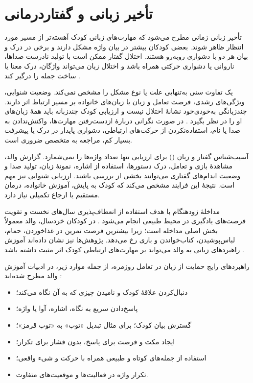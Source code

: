 \section{تأخیر زبانی و گفتاردرمانی}

تأخیر زبانی زمانی مطرح می‌شود که مهارت‌های زبانی کودک آهسته‌تر از مسیر مورد انتظار ظاهر شوند. بعضی کودکان بیشتر در بیان واژه مشکل دارند و برخی در درک و بیان هر دو با دشواری روبه‌رو هستند. اختلال گفتار ممکن است با تولید نادرست صداها، ناروانی یا دشواری حرکتی همراه باشد و اختلال زبان می‌تواند واژگان، درک معنا یا ساخت جمله را درگیر کند \cite{NIDCDMilestones2022,ASHALateLanguage}.

یک تفاوت سنی به‌تنهایی علت یا نوع مشکل را مشخص نمی‌کند. وضعیت شنوایی، ویژگی‌های رشدی، فرصت تعامل و زبان یا زبان‌های خانواده بر مسیر ارتباط اثر دارند. چندزبانگی به‌خودی‌خود نشانهٔ اختلال نیست و ارزیابی کودک چندزبانه باید همهٔ زبان‌های او را در نظر بگیرد \cite{ASHALateLanguage}. در صورت نگرانی دربارهٔ از‌دست‌رفتن مهارت‌ها، واکنش‌ندادن به صدا یا نام، استفاده‌نکردن از حرکت‌های ارتباطی، دشواری پایدار در درک یا پیشرفت بسیار کم، مراجعه به متخصص ضروری است.

آسیب‌شناس گفتار و زبان () برای ارزیابی تنها تعداد واژه‌ها را نمی‌شمارد. گزارش والد، مشاهدهٔ بازی و تعامل، درک دستورها، استفاده از اشاره، نمونهٔ زبان، تولید صدا و وضعیت اندام‌های گفتاری می‌توانند بخشی از بررسی باشند. ارزیابی شنوایی نیز مهم است. نتیجهٔ این فرایند مشخص می‌کند که کودک به پایش، آموزش خانواده، درمان مستقیم یا ارجاع تکمیلی نیاز دارد.

مداخلهٔ زودهنگام با هدف استفاده از انعطاف‌پذیری سال‌های نخست و تقویت فرصت‌های یادگیری در محیط طبیعی انجام می‌شود \cite{ASHAEarlyIntervention}. در کودکان خردسال، والد معمولاً بخش اصلی مداخله است؛ زیرا بیشترین فرصت تمرین در غذاخوردن، حمام، لباس‌پوشیدن، کتاب‌خواندن و بازی رخ می‌دهد. پژوهش‌ها نیز نشان داده‌اند آموزش راهبردهای زبانی به والد می‌تواند بر مهارت‌های ارتباطی کودک اثر مثبت داشته باشد \cite{RobertsKaiser2011,RobertsCurtis2019}.

راهبردهای رایج حمایت از زبان در تعامل روزمره، از جمله موارد زیر، در ادبیات آموزش والد مطرح شده‌اند \cite{RobertsKaiser2011,RobertsCurtis2019}:

\begin{itemize}
\item دنبال‌کردن علاقهٔ کودک و نامیدن چیزی که به آن نگاه می‌کند؛
\item پاسخ‌دادن سریع به نگاه، اشاره، آوا یا واژه؛
\item گسترش بیان کودک؛ برای مثال تبدیل «توپ» به «توپ قرمز»؛
\item ایجاد مکث و فرصت برای پاسخ، بدون فشار برای تکرار؛
\item استفاده از جمله‌های کوتاه و طبیعی همراه با حرکت و شیء واقعی؛
\item تکرار واژه در فعالیت‌ها و موقعیت‌های متفاوت.
\end{itemize}

